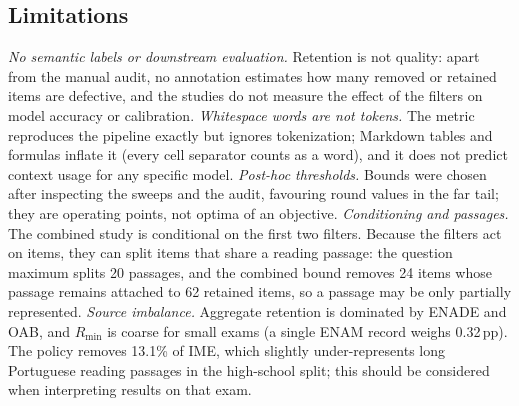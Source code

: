\subsection{Limitations}
\label{app:len-limitations}

\emph{No semantic labels or downstream evaluation.} Retention is not quality:
apart from the manual audit, no annotation estimates how many removed or
retained items are defective, and the studies do not measure the effect of
the filters on model accuracy or calibration.
\emph{Whitespace words are not tokens.} The metric reproduces the pipeline
exactly but ignores tokenization; Markdown tables and formulas inflate it
(every cell separator counts as a word), and it does not predict context
usage for any specific model.
\emph{Post-hoc thresholds.} Bounds were chosen after inspecting the sweeps and
the audit, favouring round values in the far tail; they are operating points,
not optima of an objective.
\emph{Conditioning and passages.} The combined study is conditional on the
first two filters. Because the filters act on items, they can split items
that share a reading passage: the question maximum splits 20 passages, and the
combined bound removes 24 items whose passage remains attached to 62 retained
items, so a passage may be only partially represented.
\emph{Source imbalance.} Aggregate retention is dominated by ENADE and OAB,
and $R_{\min}$ is coarse for small exams (a single ENAM record weighs
0.32\,pp). The policy removes 13.1\% of IME, which slightly under-represents
long Portuguese reading passages in the high-school split; this should be
considered when interpreting results on that exam.
